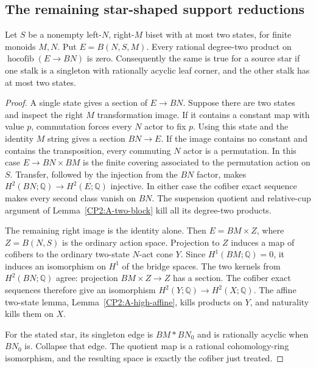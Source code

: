 \subsection{The remaining star-shaped support reductions}

\begin{lemma}
\label{CP2:A-star-coned-binary}
Let $S$ be a nonempty left-$N$, right-$M$ biset with at most
two states, for finite monoids $M,N$. Put $E=B(N,S,M)$.
Every rational degree-two product on
$\operatorname{hocofib}(E\to BN)$ is zero.
Consequently the same is true for a source star if one stalk
is a singleton with rationally acyclic leaf corner, and the
other stalk has at most two states.
\end{lemma}
\begin{proof}
A single state gives a section of $E\to BN$. Suppose there
are two states and inspect the right $M$ transformation image.
If it contains a constant map with value $p$, commutation
forces every $N$ actor to fix $p$. Using this state and the
identity $M$ string gives a section $BN\to E$. If the image
contains no constant and contains the transposition, every
commuting $N$ actor is a permutation. In this case
$E\to BN\times BM$ is the finite covering associated to the
permutation action on $S$. Transfer, followed by the injection
from the $BN$ factor, makes $H^2(BN;\mathbb Q)\to H^2(E;\mathbb Q)$
injective. In either case the cofiber exact sequence makes
every second class vanish on $BN$. The suspension quotient
and relative-cup argument of Lemma~\ref{CP2:A-two-block} kill
all its degree-two products.

The remaining right image is the identity alone. Then
$E=BM\times Z$, where $Z=B(N,S)$ is the ordinary action space.
Projection to $Z$ induces a map of cofibers to the ordinary
two-state $N$-act cone $Y$. Since $H^1(BM;\mathbb Q)=0$,
it induces an isomorphism on $H^1$ of the bridge spaces.
The two kernels from $H^2(BN;\mathbb Q)$ agree: projection
$BM\times Z\to Z$ has a section. The cofiber exact sequences
therefore give an isomorphism $H^2(Y;\mathbb Q)\to H^2(X;\mathbb Q)$.
The affine two-state lemma, Lemma~\ref{CP2:A-high-affine},
kills products on $Y$, and naturality kills them on $X$.

For the stated star, its singleton edge is $BM*BN_0$ and
is rationally acyclic when $BN_0$ is. Collapse that edge.
The quotient map is a rational cohomology-ring isomorphism,
and the resulting space is exactly the cofiber just treated.
\end{proof}

